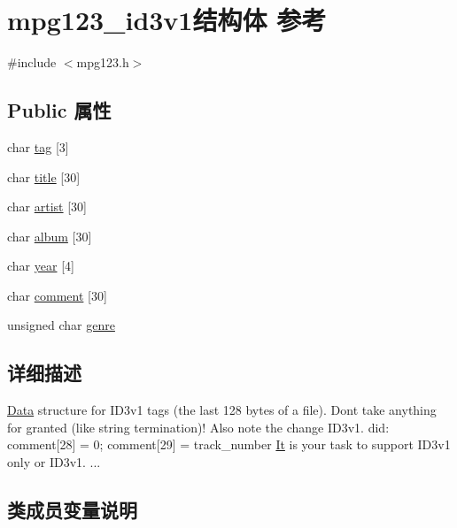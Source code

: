 \hypertarget{structmpg123__id3v1}{}\section{mpg123\+\_\+id3v1结构体 参考}
\label{structmpg123__id3v1}


{\ttfamily \#include $<$mpg123.\+h$>$}

\subsection*{Public 属性}
\begin{DoxyCompactItemize}
\item 
char \hyperlink{structmpg123__id3v1_ab75ed435e357198b4316a0c86686069b}{tag} \mbox{[}3\mbox{]}
\item 
char \hyperlink{structmpg123__id3v1_a07f4a232c9be375fc35285538ff08c98}{title} \mbox{[}30\mbox{]}
\item 
char \hyperlink{structmpg123__id3v1_a1aab043e91127fd288c379e974ffc8fe}{artist} \mbox{[}30\mbox{]}
\item 
char \hyperlink{structmpg123__id3v1_aeef247d147c96898e25b98dbdf4eba65}{album} \mbox{[}30\mbox{]}
\item 
char \hyperlink{structmpg123__id3v1_a6087be9b3b25b86cafb4d59af51a1c67}{year} \mbox{[}4\mbox{]}
\item 
char \hyperlink{structmpg123__id3v1_a32a423f6277d64b16b655eb115233e11}{comment} \mbox{[}30\mbox{]}
\item 
unsigned char \hyperlink{structmpg123__id3v1_ac7fa19ffcdc1fbb8d5fbf786606baa08}{genre}
\end{DoxyCompactItemize}


\subsection{详细描述}
\hyperlink{struct_data}{Data} structure for I\+D3v1 tags (the last 128 bytes of a file). Don\textquotesingle{}t take anything for granted (like string termination)! Also note the change I\+D3v1. did\+: comment\mbox{[}28\mbox{]} = 0; comment\mbox{[}29\mbox{]} = track\+\_\+number \hyperlink{class_it}{It} is your task to support I\+D3v1 only or I\+D3v1. ... 

\subsection{类成员变量说明}
\mbox{\label{structmpg123__id3v1_aeef247d147c96898e25b98dbdf4eba65}} 
